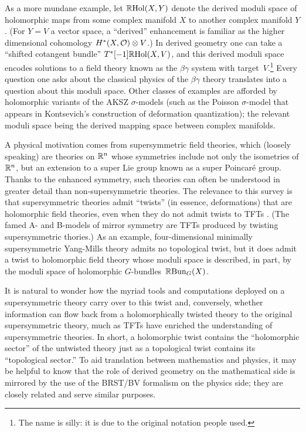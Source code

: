 \documentclass[11pt]{amsart}
\begin{document}
As a more mundane example, let $\mathbb R{\rm Hol}(X,Y)$ denote the derived moduli space of holomorphic maps from some complex manifold $X$ to another complex manifold $Y$.
(For $Y = V$ a vector space, a ``derived'' enhancement is familiar as the higher dimensional cohomology $H^*(X, \mathcal O) \otimes V$.)
In derived geometry one can take a ``shifted cotangent bundle'' $T^*[-1] \mathbb R{\rm Hol}(X,V)$,
and this derived moduli space encodes solutions to
a field theory known as the $\beta\gamma$ system with target~$V$.\footnote{The name is silly: it is due to the original notation people used.}
Every question one asks about the classical physics of the $\beta\gamma$ theory translates into a question about this moduli space.
Other classes of examples are afforded by holomorphic variants of the AKSZ $\sigma$-models (such as the Poisson $\sigma$-model that appears in Kontsevich's construction of deformation quantization); 
the relevant moduli space being the derived mapping space between complex manifolds. 

A physical motivation comes from supersymmetric field theories, 
which (loosely speaking) are theories on $\mathbb R^n$ whose symmetries include not only the isometries of $\mathbb R^n$, but an extension to a super Lie group known as a super Poincar\'e group.
Thanks to the enhanced symmetry, such theories can often be understood in greater detail than non-supersymmetric theories.
The relevance to this survey is that supersymmetric theories admit ``twists'' (in essence, deformations) that are holomorphic field theories, 
even when they do not admit twists to TFTs \cite{CosSUSY}. 
(The famed A- and B-models of mirror symmetry are TFTs produced by twisting supersymmetric thories.)
As an example, four-dimensional minimally supersymmetric Yang-Mills theory admits no topological twist, 
but it does admit a twist to holomorphic field theory whose moduli space is described, in part, by the moduli space of holomorphic $G$-bundles~$\mathbb R {\rm Bun}_G(X)$. 

It is natural to wonder how the myriad tools and computations deployed on a supersymmetric theory carry over to this twist 
and, conversely, whether information can flow back from a holomorphically twisted theory to the original supersymmetric theory, 
much as TFTs have enriched the understanding of supersymmetric theories.
In short, a holomorphic twist contains the ``holomorphic sector'' of the untwisted theory just as a topological twist contains its ``topological sector.''
To aid translation between mathematics and physics, 
it may be helpful to know that the role of derived geometry on the mathematical side is mirrored by the use of the BRST/BV formalism on the physics side;
they are closely related and serve similar purposes.
\end{document}
